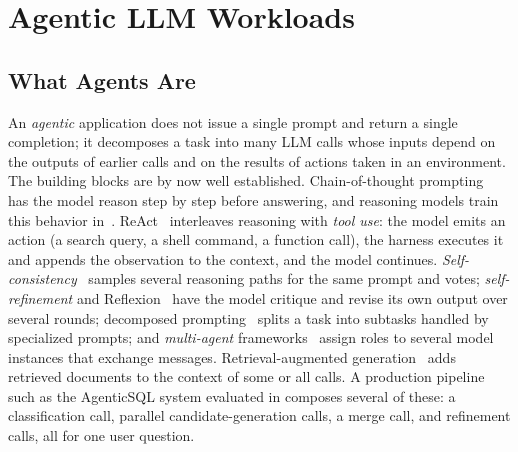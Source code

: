 \section{Agentic LLM Workloads}
\label{background:sec:agents}

\subsection{What Agents Are}
\label{background:subsec:agents_def}

An \emph{agentic} application does not issue a single prompt and return a single completion; it decomposes a task into many LLM calls whose inputs depend on the outputs of earlier calls and on the results of actions taken in an environment.
The building blocks are by now well established.
Chain-of-thought prompting~\cite{wei2022chain} has the model reason step by step before answering, and reasoning models train this behavior in~\cite{o1-preview,guo2025deepseek}.
ReAct~\cite{yao2023react} interleaves reasoning with \emph{tool use}: the model emits an action (a search query, a shell command, a function call), the harness executes it and appends the observation to the context, and the model continues.
\emph{Self-consistency}~\cite{wang2023selfconsistencyimproveschainthought} samples several reasoning paths for the same prompt and votes; \emph{self-refinement} and Reflexion~\cite{madaan2023selfrefine,shinn2023reflexion} have the model critique and revise its own output over several rounds; decomposed prompting~\cite{khot2023decomposedpromptingmodularapproach} splits a task into subtasks handled by specialized prompts; and \emph{multi-agent} frameworks~\cite{wu2023autogen,chen2024autoagentsframeworkautomaticagent,wang2024mixtureofagentsenhanceslargelanguage} assign roles to several model instances that exchange messages.
Retrieval-augmented generation~\cite{gao2024retrievalaugmentedgenerationlargelanguage,wang2024speculativeragenhancingretrieval} adds retrieved documents to the context of some or all calls.
A production pipeline such as the AgenticSQL system evaluated in  composes several of these: a classification call, parallel candidate-generation calls, a merge call, and refinement calls, all for one user question.

